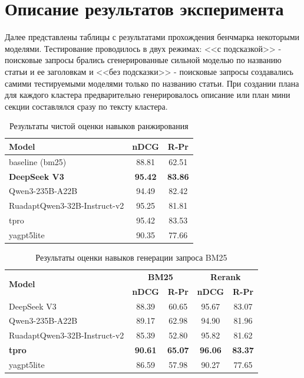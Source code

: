 \documentclass{article}
\theoremstyle{definition}
\theoremstyle{plain}
\begin{document}
\section*{Описание результатов эксперимента}
Далее представлены таблицы с результатами прохождения бенчмарка некоторыми моделями. Тестирование проводилось в двух режимах: <<с подсказкой>> - поисковые запросы брались сгенерированные сильной моделью по названию статьи и ее заголовкам и 
<<без подсказки>> - поисковые запросы создавались самими тестируемыми моделями только по названию статьи.
При создании плана для каждого кластера предварительно генерировалось описание или план мини секции составлялся сразу по тексту кластера.

\begin{table}[ht!]
\centering
\caption{Результаты чистой оценки навыков ранжирования}
\begin{tabular}{l|c|c}
\hline
\textbf{Model} & \textbf{nDCG} & \textbf{R‑Pr} \\
\hline
baseline (bm25)     & 88.81 & 62.51 \\
\hline
\textbf{DeepSeek V3}         & \textbf{95.42} & \textbf{83.86} \\
Qwen3-235B-A22B              & 94.49 & 82.42 \\
RuadaptQwen3-32B-Instruct-v2 & 95.25 & 81.81 \\
tpro                         & 95.42 & 83.53 \\
yagpt5lite                   & 90.35 & 77.66 \\
\hline
\end{tabular}
\label{tab:query_ref}
\end{table}

\begin{table}[ht]
\centering
\caption{Результаты оценки навыков генерации запроса BM25}
\begin{tabular}{l|cc|cc}
\hline
\multirow{2}{*}{\textbf{Model}} & \multicolumn{2}{c|}{\textbf{BM25}} & \multicolumn{2}{c}{\textbf{Rerank}} \\
 & \textbf{nDCG} & \textbf{R-Pr} & \textbf{nDCG} & \textbf{R-Pr} \\
\hline
DeepSeek V3                    &  88.39 & 60.65 & 95.67 & 83.07 \\
Qwen3-235B-A22B                & 89.17 & 62.98 & 94.90 & 81.96 \\
RuadaptQwen3-32B-Instruct-v2   & 85.39 & 52.80 & 95.82 & 81.62 \\
\textbf{tpro}                  & \textbf{90.61} & \textbf{65.07} & \textbf{96.06} & \textbf{83.37} \\
yagpt5lite                     & 86.59 & 57.98 & 90.27 & 77.65 \\
\hline
\end{tabular}
\label{tab:query_def}
\end{table}
\end{document}
